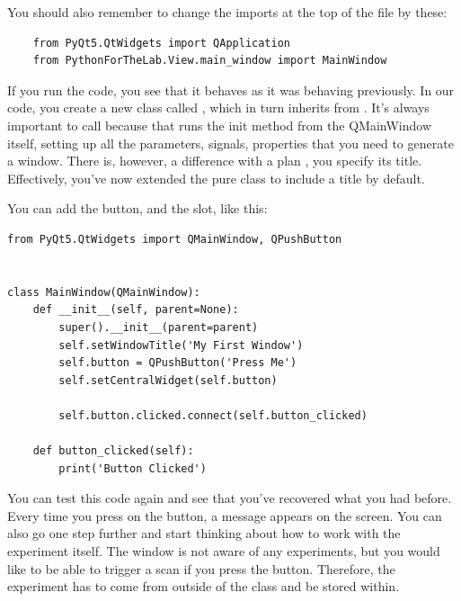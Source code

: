 You should also remember to change the imports at the top of the file by these:

\begin{verbatim}
    from PyQt5.QtWidgets import QApplication
    from PythonForTheLab.View.main_window import MainWindow
\end{verbatim}

If you run the code, you see that it behaves as it was behaving previously. In our code, you create a new class called , which in turn inherits from . It's always important to call  because that runs the init method from the QMainWindow itself, setting up all the parameters, signals, properties that you need to generate a window. There is, however, a difference with a plan , you specify its title. Effectively, you've now extended the pure  class to include a title by default.


You can add the button, and the slot, like this:

\begin{verbatim}
from PyQt5.QtWidgets import QMainWindow, QPushButton


class MainWindow(QMainWindow):
    def __init__(self, parent=None):
        super().__init__(parent=parent)
        self.setWindowTitle('My First Window')
        self.button = QPushButton('Press Me')
        self.setCentralWidget(self.button)

        self.button.clicked.connect(self.button_clicked)

    def button_clicked(self):
        print('Button Clicked')
\end{verbatim}

You can test this code again and see that you've recovered what you had before. Every time you press on the button, a message appears on the screen. You can also go one step further and start thinking about how to work with the experiment itself. The window is not aware of any experiments, but you would like to be able to trigger a scan if you press the button. Therefore, the experiment has to come from outside of the class and be stored within.

